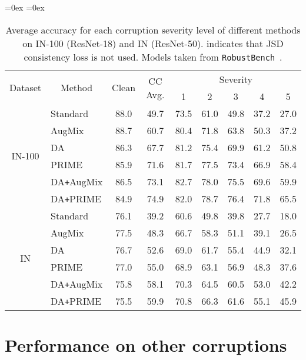 \documentclass[runningheads]{llncs}
\begin{document}
\begin{table*}[t]
\centering
\footnotesize
\caption{Average accuracy for each corruption severity level of different methods on IN-100 (ResNet-18) and IN (ResNet-50).  indicates that JSD consistency loss is not used. Models taken from \texttt{RobustBench}~\protect\cite{robustbench2021}.}
\aboverulesep=0ex
\belowrulesep=0ex
\begin{tabular}{clcc|ccccc}
    \toprule
    \multirow{2}{*}{Dataset} & \multicolumn{1}{c}{\multirow{2}{*}{Method}} & \multicolumn{1}{c}{\multirow{2}{*}{Clean}} & \multicolumn{1}{c|}{\multirow{2}{*}{CC Avg.}} & \multicolumn{5}{c}{Severity} \\
& & & & 1 & 2 & 3 & 4 & 5\\
    \midrule
    \multirow{6}{*}{IN-100} & Standard & 88.0 & 49.7 & 73.5 & 61.0 & 49.8 & 37.2 & 27.0\\
    & AugMix & 88.7 & 60.7 & 80.4 & 71.8 & 63.8 & 50.3 & 37.2\\
    & DA & 86.3 & 67.7 & 81.2 & 75.4 & 69.9 & 61.2 & 50.8\\
    & PRIME & 85.9 & 71.6 & 81.7 & 77.5 & 73.4 & 66.9 & 58.4\\
    \cmidrule{2-9}
    & DA\texttt{+}AugMix & 86.5 & 73.1 & 82.7 & 78.0 & 75.5 & 69.6 & 59.9\\
    & DA\texttt{+}PRIME & 84.9 & 74.9 & 82.0 & 78.7 & 76.4 & 71.8 & 65.5\\
    \midrule
    \multirow{7}{*}{IN} & Standard & 76.1 & 39.2 & 60.6 & 49.8 & 39.8 & 27.7 & 18.0 \\
    & AugMix & 77.5 & 48.3 & 66.7 & 58.3 & 51.1 & 39.1 & 26.5 \\
    & DA & 76.7 & 52.6 & 69.0 & 61.7 & 55.4 & 44.9 & 32.1 \\
    & PRIME & 77.0 & 55.0 & 68.9 & 63.1 & 56.9 & 48.3 & 37.6 \\
\cmidrule{2-9}
    & DA\texttt{+}AugMix & 75.8 & 58.1 & 70.3 & 64.5 & 60.5 & 53.0 & 42.2 \\
    & DA\texttt{+}PRIME & 75.5 & 59.9 & 70.8 & 66.3 & 61.6 & 55.1 & 45.9 \\
\bottomrule
\end{tabular}
\label{tab:results-per-severity-imagenet}
\end{table*}

\section{Performance on other corruptions}
\label{app:other_datasets}
\end{document}
